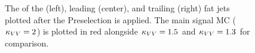 \begin{figure}[htb]
    \centering
    \qquad
    \qquad
    \caption{
        The \pt of the \Htobb (left), leading \Vtoqq (center), and trailing \Vtoqq (right) fat jets plotted after the Preselection is applied. 
        The main signal MC ($\kappa_{VV} = 2$) is plotted in red alongside $\kappa_{VV} = 1.5$ and $\kappa_{VV} = 1.3$ for comparison. 
    }
    \label{fig:vbsvvh_fatjet_pts}
\end{figure}

